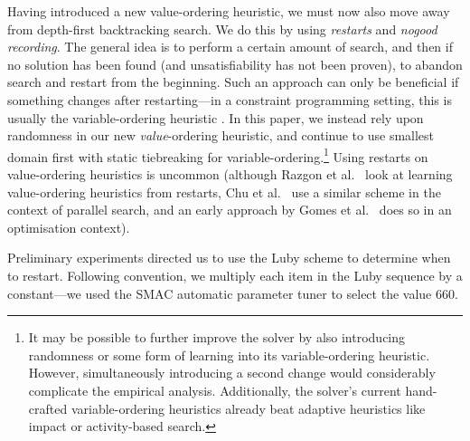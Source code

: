 \documentclass[runningheads]{llncs}
\newcommand{\siplineref}[1]{line~\ref{line:sip:#1}}
\newcommand{\citet}[2]{#1\cite{#2}}
\begin{document}
Having introduced a new value-ordering heuristic, we must now also move away from depth-first
backtracking search. We do this by using \emph{restarts} and \emph{nogood recording}. The general
idea is to perform a certain amount of search, and then if no solution has been found (and
unsatisfiability has not been proven), to abandon search and restart from the beginning. Such an
approach can only be beneficial if something changes after restarting---in a constraint programming
setting, this is usually the variable-ordering heuristic
\cite{DBLP:journals/jsat/LecoutreSTV07,DBLP:conf/cp/GayHLS15,DBLP:conf/aaai/LeeSZ16,DBLP:conf/cp/GlorianBLLM17}.
In this paper, we instead rely upon randomness in our new \emph{value}-ordering heuristic, and
continue to use smallest domain first with static tiebreaking for variable-ordering.\footnote{It may
be possible to further improve the solver by also introducing randomness or some form of learning
into its variable-ordering heuristic. However, simultaneously introducing a second change would
considerably complicate the empirical analysis. Additionally, the solver's current hand-crafted
variable-ordering heuristics already beat adaptive heuristics like impact or activity-based search.}
Using restarts on value-ordering heuristics is uncommon (although \citet{Razgon et al.\
}{DBLP:conf/flairs/RazgonOP07} look at learning value-ordering heuristics from restarts, \citet{Chu
et al.\ }{DBLP:conf/cp/ChuSS09} use a similar scheme in the context of parallel search, and an early
approach by \citet{Gomes et al.\ }{DBLP:conf/aaai/GomesSK98} does so in an optimisation context).


Preliminary experiments directed us to use the Luby scheme \cite{DBLP:journals/ipl/LubySZ93} to
determine when to restart.
Following convention, we multiply each item in the Luby sequence by a constant---we used the SMAC
automatic parameter tuner \cite{DBLP:conf/lion/HutterHL11} to select the value 660.
\end{document}
